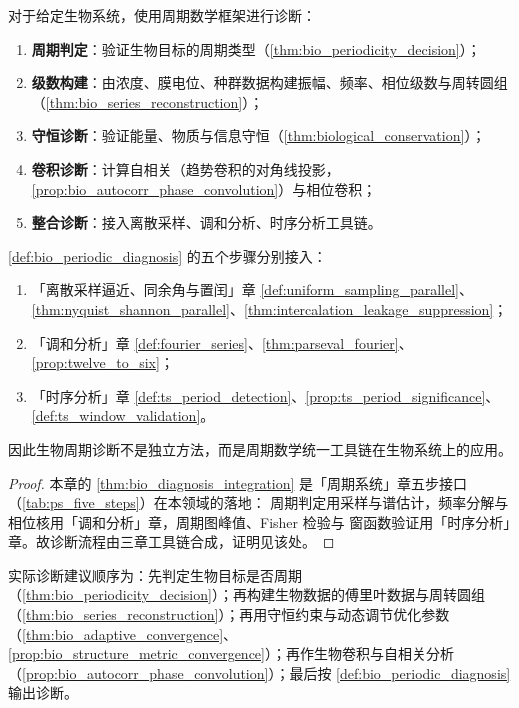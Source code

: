 \begin{definition}[生物周期诊断流程]\label{def:bio_periodic_diagnosis}
对于给定生物系统，使用周期数学框架进行诊断：
\begin{enumerate}[label=(\roman*)]
    \item \textbf{周期判定}：验证生物目标的周期类型（\cref{thm:bio_periodicity_decision}）；
    \item \textbf{级数构建}：由浓度、膜电位、种群数据构建振幅、频率、相位级数与周转圆组（\cref{thm:bio_series_reconstruction}）；
    \item \textbf{守恒诊断}：验证能量、物质与信息守恒（\cref{thm:biological_conservation}）；
    \item \textbf{卷积诊断}：计算自相关（趋势卷积的对角线投影，\cref{prop:bio_autocorr_phase_convolution}）与相位卷积；
    \item \textbf{整合诊断}：接入离散采样、调和分析、时序分析工具链。
\end{enumerate}
\end{definition}

\begin{theorem}[生物周期诊断流程与三章接口]\label{thm:bio_diagnosis_integration}
\cref{def:bio_periodic_diagnosis} 的五个步骤分别接入：
\begin{enumerate}[label=(\roman*)]
    \item 「离散采样逼近、同余角与置闰」章 \cref{def:uniform_sampling_parallel}、\cref{thm:nyquist_shannon_parallel}、\cref{thm:intercalation_leakage_suppression}；
    \item 「调和分析」章 \cref{def:fourier_series}、\cref{thm:parseval_fourier}、\cref{prop:twelve_to_six}；
    \item 「时序分析」章 \cref{def:ts_period_detection}、\cref{prop:ts_period_significance}、\cref{def:ts_window_validation}。
\end{enumerate}
因此生物周期诊断不是独立方法，而是周期数学统一工具链在生物系统上的应用。
\end{theorem}

\begin{proof}
本章的 \cref{thm:bio_diagnosis_integration} 是「周期系统」章五步接口（\cref{tab:ps_five_steps}）在本领域的落地：
周期判定用采样与谱估计，频率分解与相位核用「调和分析」章，周期图峰值、Fisher 检验与
窗函数验证用「时序分析」章。故诊断流程由三章工具链合成，证明见该处。
\end{proof}

\begin{remark}[整合后的操作顺序]\label{rem:bio_integration_order}
实际诊断建议顺序为：先判定生物目标是否周期（\cref{thm:bio_periodicity_decision}）；再构建生物数据的傅里叶数据与周转圆组（\cref{thm:bio_series_reconstruction}）；再用守恒约束与动态调节优化参数（\cref{thm:bio_adaptive_convergence}、\cref{prop:bio_structure_metric_convergence}）；再作生物卷积与自相关分析（\cref{prop:bio_autocorr_phase_convolution}）；最后按 \cref{def:bio_periodic_diagnosis} 输出诊断。
\end{remark}

